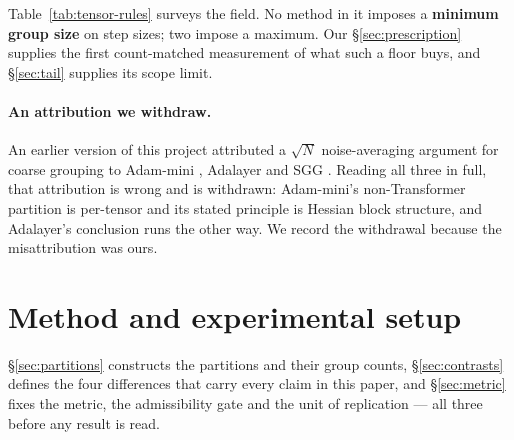 \documentclass[10pt,letterpaper]{article}
\begin{document}
Table~\ref{tab:tensor-rules} surveys the field. No method in it imposes a \textbf{minimum group
size} on step sizes; two impose a maximum. Our \S\ref{sec:prescription} supplies the first
count-matched measurement of what such a floor buys, and \S\ref{sec:tail} supplies its scope
limit.

\paragraph{An attribution we withdraw.}
An earlier version of this project attributed a $\sqrt{N}$ noise-averaging argument for coarse
grouping to Adam-mini \citep{zhang2024adammini}, Adalayer \citep{zhao2024adalayer} and SGG
\citep{li2025sgg}. Reading all three in full, that attribution is wrong and is withdrawn:
Adam-mini's non-Transformer partition is per-tensor and its stated principle is Hessian block
structure, and Adalayer's conclusion runs the other way. We record the withdrawal because the
misattribution was ours.

\section{Method and experimental setup}
\label{sec:method}

\S\ref{sec:partitions} constructs the partitions and their group counts, \S\ref{sec:contrasts}
defines the four differences that carry every claim in this paper, and \S\ref{sec:metric} fixes
the metric, the admissibility gate and the unit of replication --- all three before any result is
read.
\end{document}
